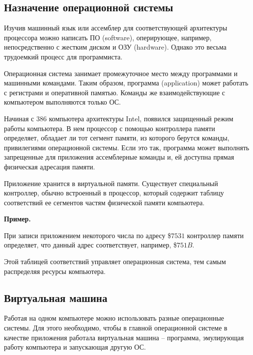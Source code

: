 \documentclass[a4paper, fleqn]{article}
\newenvironment{example}[1][]{\medskip \noindent \textbf{Пример. #1}\par \nopagebreak}{\medskip \par} %
\begin{document}
			
			\subsection*{Назначение операционной системы}
			 
			Изучив машинный язык или ассемблер для соответствующей архитектуры процессора можно написать ПО (software), оперирующее, например, непосредственно с жестким диском и ОЗУ (hardware). Однако это весьма трудоемкий процесс для программиста. 
			
			Операционная система занимает промежуточное место между программами и машинными командами. Таким образом, программа (application) может работать с регистрами и оперативной памятью. Команды же взаимодействующие с компьютером выполняются только ОС.
			
			Начиная с 386 компьютера архитектуры Intel, появился защищенный режим работы компьютера. В нем процессор с помощью контроллера памяти определяет, обладает ли тот сегмент памяти, из которого берутся команды, привилегиями операционной системы. Если это так, программа может выполнять запрещенные для приложения ассемблерные команды и, ей доступна прямая физическая адресация памяти. 
			
			Приложение хранится в виртуальной памяти. Существует специальный контроллер,
			обычно встроенный в процессор, который содержит таблицу соответствий ее сегментов частям физической памяти компьютера.
			
			\begin{example}
				
				При записи приложением некоторого числа по адресу \$$7531$ контроллер памяти определяет, что данный адрес соответствует, например, \$$751B$. 
			\end{example}
			
			Этой таблицей соответствий управляет операционная система, тем самым распределяя ресурсы компьютера.
			
			\subsection*{Виртуальная машина} 
		
			Работая на одном компьютере можно использовать разные операционные системы. Для этого необходимо, чтобы в главной операционной системе в качестве приложения работала виртуальная машина  – программа, эмулирующая работу компьютера и запускающая другую ОС. 
			
\end{document}
